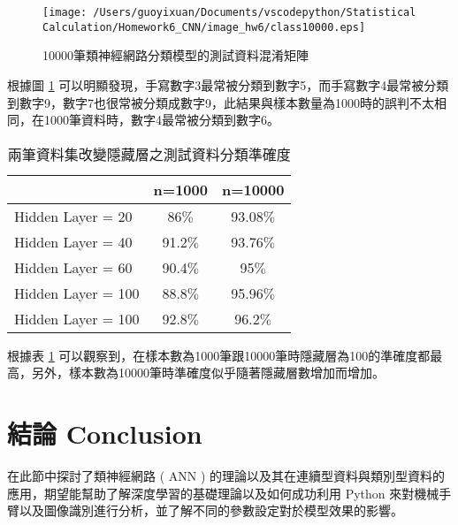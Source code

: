 \begin{figure}[H]
    \centering
        \texttt{[image: /Users/guoyixuan/Documents/vscodepython/Statistical Calculation/Homework6\_CNN/image\_hw6/class10000.eps]}
    \caption{10000筆類神經網路分類模型的測試資料混淆矩陣}
    \label{fig:class10000}
\end{figure}

根據圖 \ref{fig:class10000} 可以明顯發現，手寫數字3最常被分類到數字5，而手寫數字4最常被分類到數字9，數字7也很常被分類成數字9，此結果與樣本數量為1000時的誤判不太相同，在1000筆資料時，數字4最常被分類到數字6。

\begin{table}[H] 
  \centering
  \caption{兩筆資料集改變隱藏層之測試資料分類準確度}\label{tb:digits}
  \extrarowheight=1pt   %
  \begin{tabular}{lcc}  %
  \hline
    & n=1000 & n=10000  \\\hline
   Hidden Layer = 20 & 86$\%$ & 93.08$\%$  \\
   Hidden Layer = 40 & 91.2$\%$ & 93.76$\%$  \\
   Hidden Layer = 60 & 90.4$\%$ & 95$\%$  \\
   Hidden Layer = 100 & 88.8$\%$ & 95.96$\%$  \\
   Hidden Layer = 100 & 92.8$\%$ & 96.2$\%$  \\\hline
  \end{tabular}
\end{table}

根據表 \ref{tb:digits} 可以觀察到，在樣本數為1000筆跟10000筆時隱藏層為100的準確度都最高，另外，樣本數為10000筆時準確度似乎隨著隱藏層數增加而增加。

\section{結論 Conclusion}

在此節中探討了類神經網路 ( ANN ) 的理論以及其在連續型資料與類別型資料的應用，期望能幫助了解深度學習的基礎理論以及如何成功利用 Python 來對機械手臂以及圖像識別進行分析，並了解不同的參數設定對於模型效果的影響。

